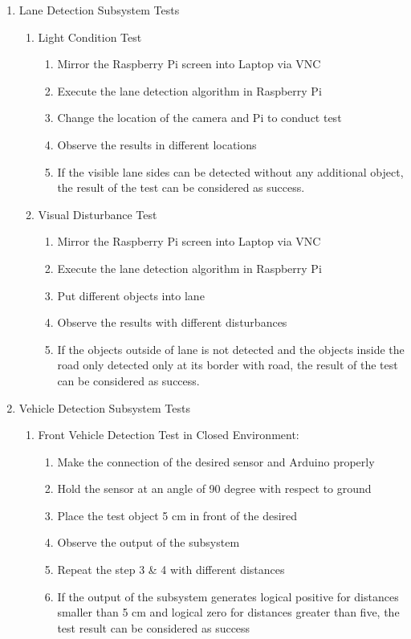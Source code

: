 \documentclass[a4paper,12pt]{article}
\begin{document}
	\begin{enumerate}
	\item {Lane Detection Subsystem Tests}	
	\begin{enumerate}
		\item{Light Condition Test}
				\begin{enumerate}
				\item Mirror the Raspberry Pi screen into Laptop via VNC  
				\item Execute the lane detection algorithm in Raspberry Pi 
				\item Change the location of the camera and Pi to conduct test 
				\item Observe the results in different locations   
				\item If the visible lane sides can be detected without any additional object, the result of the test can be considered as success. 
			\end{enumerate}
		\item{Visual Disturbance Test}
			\begin{enumerate}
			\item Mirror the Raspberry Pi screen into Laptop via VNC   
			\item Execute the lane detection algorithm in Raspberry Pi  
			\item Put different objects into lane  
			\item Observe the results with different disturbances 
			\item If the objects outside of lane is not detected and the objects inside the road only detected only at its border with road, the result of the test can be considered as success.  
		\end{enumerate}
	\end{enumerate}
	
	\item {Vehicle Detection Subsystem Tests}\label{sect:vhd}
		
		\begin{enumerate}
		
		\item Front Vehicle Detection Test in Closed Environment:
			\begin{enumerate}
				\item Make the connection of the desired sensor and Arduino properly  
				\item Hold the sensor at an angle of 90 degree with respect to ground  
				\item Place the test object 5 cm in front of the desired  
				\item Observe the output of the subsystem  
				\item Repeat the step 3 \& 4 with different distances  
				\item If the output of the subsystem generates logical positive for distances smaller than 5 cm and logical zero for distances greater than five, the test result can be considered as success  
			\end{enumerate}					
		

\end{enumerate}
\end{enumerate}
\end{document}
